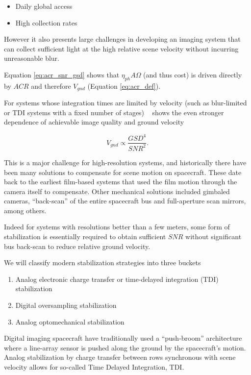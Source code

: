 \documentclass[]{spieman}  %
\begin{document}
\begin{itemize}
\item Daily global access
\item High collection rates
\end{itemize}

However it also presents large challenges in developing an imaging system that can collect sufficient light at the high relative scene velocity without incurring unreasonable blur.

Equation \eqref{eq:acr_snr_gsd} shows that $\eta_{ph} A \Omega$ (and thus cost) is driven directly by $ACR$ and therefore $V_{gnd}$ (Equation \eqref{eq:acr_def}).

For systems whose integration times are limited by velocity (such as blur-limited or TDI systems with a fixed number of stages) ~\cite{shaw} shows the   even stronger dependence of achievable image quality and ground velocity

\begin{equation*}
V_{gnd} \propto \frac{GSD^4}{SNR^2}.
\end{equation*}

This is a major challenge for high-resolution systems, and historically there have been many solutions to compensate for scene motion on spacecraft.  These date back to the earliest film-based systems that used the film motion through the camera itself to compensate.  Other mechanical solutions included gimbaled cameras, ``back-scan'' of the entire spacecraft bus and full-aperture scan mirrors, among others.

Indeed for systems with resolutions better than a few meters, some form of stabilization is essentially required to obtain sufficient $SNR$ without significant bus back-scan to reduce relative ground velocity.

We will classify modern stabilization strategies into three  buckets

\begin{enumerate}
\item Analog electronic charge transfer or time-delayed integration (TDI) stabilization
\item Digital oversampling stabilization
\item Analog optomechanical stabilization
\end{enumerate}

Digital imaging spacecraft have traditionally used a ``push-broom'' architecture where a line-array sensor is pushed along the ground by the spacecraft's motion.  Analog stabilization by charge transfer between rows synchronous with scene velocity allows for so-called Time Delayed Integration, TDI.  
\end{document}
